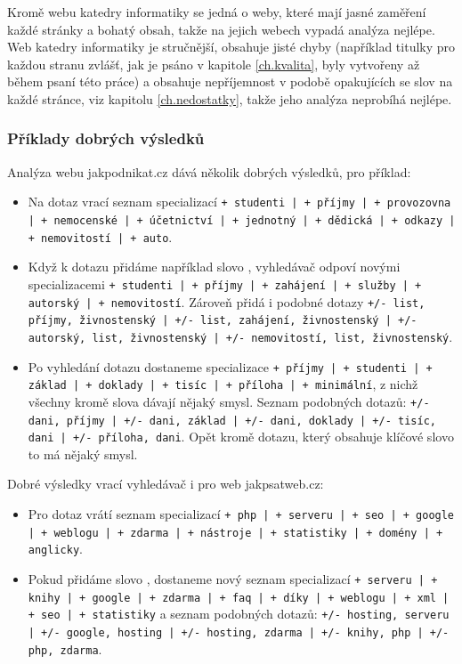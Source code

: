 \documentclass[12pt]{article}
\newcommand{\code}[1]{\texttt{#1}}
\newcommand{\sssection}[1]{\subsubsection{#1}}
\begin{document}
Kromě webu katedry informatiky se jedná o weby, které mají jasné zaměření každé stránky a bohatý obsah, takže na jejich webech vypadá analýza nejlépe. Web katedry informatiky je stručnější, obsahuje jisté chyby (například titulky pro každou stranu zvlášť, jak je psáno v kapitole \ref{ch.kvalita}, byly vytvořeny až během psaní této práce) a obsahuje nepříjemnost v podobě opakujících se slov na každé stránce, viz kapitolu \ref{ch.nedostatky}, takže jeho analýza neprobíhá nejlépe. 

\sssection{Příklady dobrých výsledků}
Analýza webu jakpodnikat.cz dává několik dobrých výsledků, pro příklad:

\begin{itemize}
	\item Na dotaz  vrací seznam specializací \code{+ studenti | + příjmy | + provozovna | + nemocenské | + účetnictví | + jednotný | + dědická | + odkazy | + nemovitostí | + auto}.
	\item Když k dotazu přidáme například slovo , vyhledávač odpoví novými specializacemi \code{+ studenti | + příjmy | + zahájení | + služby | + autorský | + nemovitostí}. Zároveň přidá i podobné dotazy \code{+/- list, příjmy, živnostenský | +/- list, zahájení, živnostenský | +/- autorský, list, živnostenský | +/- nemovitostí, list, živnostenský}.
	\item Po vyhledání dotazu  dostaneme specializace \code{+ příjmy | + studenti | + základ | + doklady | + tisíc | + příloha | + minimální}, z nichž všechny kromě slova  dávají nějaký smysl. Seznam podobných dotazů: \code{+/- dani, příjmy | +/- dani, základ | +/- dani, doklady | +/- tisíc, dani | +/- příloha, dani}. Opět kromě dotazu, který obsahuje klíčové slovo  to má nějaký smysl. 
\end{itemize}

Dobré výsledky vrací vyhledávač i pro web jakpsatweb.cz: 

\begin{itemize}
	\item Pro dotaz  vrátí seznam specializací \code{+ php | + serveru | + seo | + google | + weblogu | + zdarma | + nástroje | + statistiky | + domény | + anglicky}. 
	\item Pokud přidáme slovo , dostaneme nový seznam specializací \code{+ serveru | + knihy | + google | + zdarma | + faq | + díky | + weblogu | + xml | + seo | + statistiky} a seznam podobných dotazů: \code{+/- hosting, serveru | +/- google, hosting | +/- hosting, zdarma | +/- knihy, php | +/- php, zdarma}.
\end{itemize}
\end{document}
